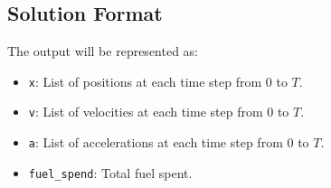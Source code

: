 \documentclass{article}
\begin{document}
\subsection*{Solution Format}

The output will be represented as:
\begin{itemize}
    \item \texttt{x}: List of positions at each time step from 0 to \( T \).
    \item \texttt{v}: List of velocities at each time step from 0 to \( T \).
    \item \texttt{a}: List of accelerations at each time step from 0 to \( T \).
    \item \texttt{fuel\_spend}: Total fuel spent.
\end{itemize}
\end{document}
